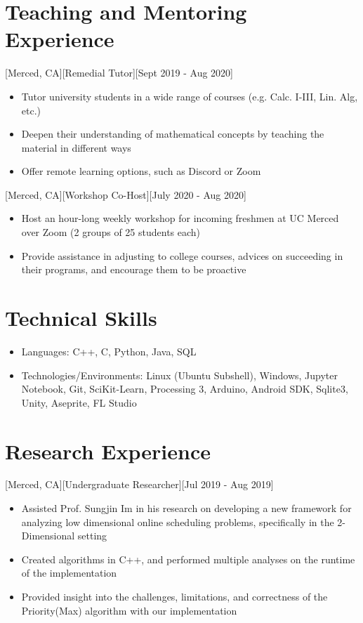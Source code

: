 \documentclass{article}
\begin{document}
\section{Teaching and Mentoring Experience }
[Merced, CA][Remedial Tutor][Sept 2019 - Aug 2020]
\begin{itemize}
  \item Tutor university students in a wide range of courses (e.g. Calc. I-III, Lin. Alg, etc.)
  \item Deepen their understanding of mathematical concepts by teaching the material in different ways
  \item Offer remote learning options, such as Discord or Zoom
\end{itemize}
[Merced, CA][Workshop Co-Host][July 2020 - Aug 2020]
\begin{itemize}
  \item Host an hour-long weekly workshop for incoming freshmen at UC Merced over Zoom (2 groups of 25 students each)
  \item Provide assistance in adjusting to college courses, advices on succeeding in their programs, and encourage them to be proactive
\end{itemize}

\section{Technical Skills}
\begin{itemize}
  \item Languages: C++, C, Python, Java, SQL
  \item Technologies/Environments: Linux (Ubuntu Subshell), Windows, Jupyter Notebook, Git, SciKit-Learn, Processing 3, Arduino, Android SDK, Sqlite3, Unity, Aseprite, FL Studio
\end{itemize}

\section{Research Experience}
[Merced, CA][Undergraduate Researcher][Jul 2019 - Aug 2019]
\begin{itemize}
  \item Assisted Prof. Sungjin Im in his research on developing a new framework for analyzing low dimensional online scheduling problems, specifically in the 2-Dimensional setting
  \item Created algorithms in C++, and performed multiple analyses on the runtime of the implementation
  \item Provided insight into the challenges, limitations, and correctness of the Priority(Max) algorithm with our implementation
\end{itemize}
\end{document}
